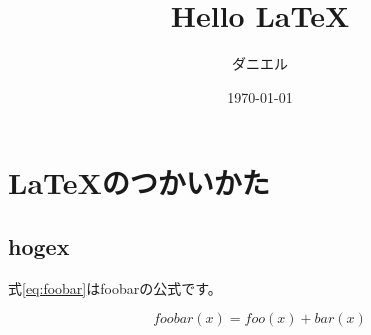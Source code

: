 \documentclass[a4paper,11pt,xelatex,ja=standard]{bxjsarticle}
\title{Hello \LaTeX}
\author{ダニエル}
\date{\today}
\begin{document}
\maketitle

\section{\LaTeX のつかいかた}
\subsection{hogex}
式\ref{eq:foobar}はfoobarの公式です。

\begin{equation}
    \label{eq:foobar}
    foobar(x) = foo(x) + bar(x)
\end{equation}
\end{document}
